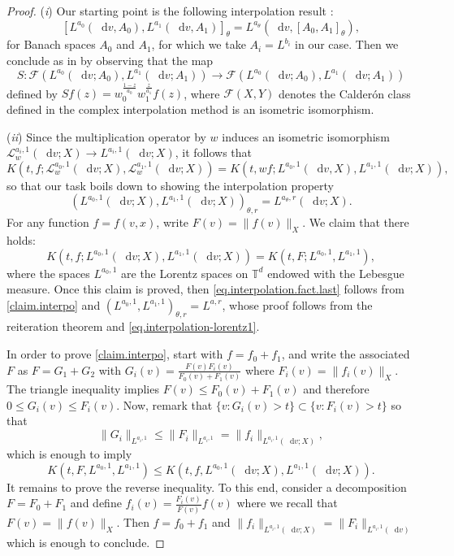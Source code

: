 \documentclass[11pt,a4paper,reqno]{amsart}
\theoremstyle{plain}
\theoremstyle{remark}
\newcommand{\dd}{\mathop{}\!\mathrm{d}}
\begin{document}
\begin{proof}
(\textit{i}) Our starting point is the following interpolation result \cite[Theorem 5.1.2]{BerghLofstrom}: 
    \[
        [L^{a_0}(\dd v,A_0),L^{a_1}(\dd v,A_1)]_{\theta} = L^{a_{\theta}}(\dd v,[A_0,A_1]_{\theta}),
    \]
    for Banach spaces $A_0$ and $A_1$, for which we take $A_i=L^{b_i}$ in our case. Then we conclude as in \cite[Theorem 5.5.3]{BerghLofstrom} by observing that the map
    \[
        S : \mathcal{F}(L^{a_0}(\dd v ;A_0),L^{a_1}(\dd v ; A_1)) \longrightarrow \mathcal{F}(L^{a_0}(\dd v ;A_0),L^{a_1}(\dd v ; A_1))    
    \]
    defined by $Sf(z)=w_0^{\frac{1-z}{a_0}}w_1^{\frac{z}{a_1}} f(z)$, where $\mathcal{F}(X,Y)$ denotes the Calder\'on class defined in the complex interpolation method is an isometric isomorphism.
    
\medskip 
(\textit{ii}) Since the multiplication operator by $w$ induces an isometric isomorphism $\mathcal{L}_w^{a_i,1}(\dd v;X) \to L^{a_i,1}(\dd v;X)$, it follows that 
\[
    K\left(t,f;\mathcal{L}_w^{a_0,1}(\dd v;X),\mathcal{L}_w^{a_1,1}(\dd v;X)\right) = K\left(t,wf; L^{a_0,1}(\dd v,X), L^{a_1,1}(\dd v;X)\right),
\]
so that our task boils down to showing the interpolation property 
\begin{equation}
    \label{eq.interpolation.fact.last}
    \left(L^{a_0,1}(\dd v;X), L^{a_1,1}(\dd v;X)\right)_{\theta,r}=L^{a_{\theta},r}(\dd v;X). 
\end{equation}
For any function $f=f(v,x)$, write $F(v)=\|f(v)\|_X$. We claim that there holds:
\begin{equation}
    \label{claim.interpo}
    K(t,f;L^{a_0,1}(\dd v;X),L^{a_1,1}(\dd v;X)) = K(t,F;L^{a_0,1},L^{a_1,1}),
\end{equation}
where the spaces $L^{a_0,1}$ are the Lorentz spaces on $\mathbb{T}^d$ endowed with the Lebesgue measure. Once this claim is proved, then \eqref{eq.interpolation.fact.last} follows from \eqref{claim.interpo} and $(L^{a_0,1},L^{a_1,1})_{\theta,r}= L^{a,r}$, whose proof follows from the reiteration theorem and \eqref{eq.interpolation-lorentz1}. 

In order to prove \eqref{claim.interpo}, start with $f=f_0+f_1$, and write the associated $F$ as $F=G_1 + G_2$ with $G_i(v)=\frac{F(v)F_i(v)}{F_0(v)+F_1(v)}$ where $F_i(v)=\|f_i(v)\|_X$. The triangle inequality implies $F(v) \leq F_0(v)+F_1(v)$ and therefore $0\leq G_i(v) \leq F_i(v)$. Now, remark that $\{v : G_i(v)>t\} \subset \{v : F_i(v)>t\}$ so that 
\[
    \|G_i\|_{L^{a_i,1}} \leq \|F_i\|_{L^{a_i,1}} = \|f_i\|_{L^{a_i,1}(\dd v;X)},
\] 
which is enough to imply
\[
    K(t,F,L^{a_0,1},L^{a_1,1}) \leq K(t,f,L^{a_0,1}(\dd v;X),L^{a_1,1}(\dd v;X)).
\]
It remains to prove the reverse inequality. To this end, consider a decomposition $F=F_0+F_1$ and define $f_i(v)=\frac{F_i(v)}{F(v)}f(v)$ where we recall that $F(v)=\|f(v)\|_{X}$. Then $f=f_0+f_1$ and $\|f_i\|_{L^{a_i,1}(\dd v;X)}=\|F_i\|_{L^{a_i,1}(\dd v)}$ which is enough to conclude.
\end{proof}
\end{document}
